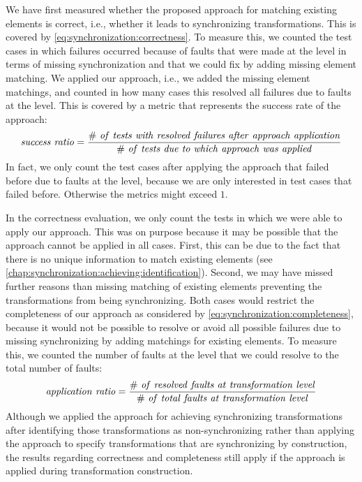 We have first measured whether the proposed approach for matching existing elements is correct, i.e., whether it leads to synchronizing transformations. This is covered by \autoref{eq:synchronization:correctness}.
To measure this, we counted the test cases in which failures occurred because of faults that were made at the \leveltransformation level in terms of missing synchronization and that we could fix by adding missing element matching.
We applied our approach, i.e., we added the missing element matchings, and counted in how many cases this resolved all failures due to faults at the \leveltransformation level.
This is covered by a metric that represents the success rate of the approach:
\begin{align*}
    \mathvariable{success\ ratio} = \frac{\mathvariable{\#\ of\ tests\ with\ resolved\ failures\ after\ approach\ application}}{\mathvariable{\#\ of\ tests\ due\ to\ which\ approach\ was\ applied}}
\end{align*}
In fact, we only count the test cases after applying the approach that failed before due to faults at the \leveltransformation level, because we are only interested in test cases that failed before. Otherwise the metrics might exceed $1$.

In the correctness evaluation, we only count the tests in which we were able to apply our approach.
This was on purpose because it may be possible that the approach cannot be applied in all cases.
First, this can be due to the fact that there is no unique information to match existing elements (see \autoref{chap:synchronization:achieving:identification}).
Second, we may have missed further reasons than missing matching of existing elements preventing the transformations from being synchronizing.
Both cases would restrict the completeness of our approach as considered by \autoref{eq:synchronization:completeness}, because it would not be possible to resolve or avoid all possible failures due to missing synchronizing by adding matchings for existing elements.
To measure this, we counted the number of faults at the \leveltransformation level that we could resolve to the total number of faults:
\begin{align*}
    \mathvariable{application\ ratio} = \frac{\mathvariable{\#\ of\ resolved\ faults\ at\ \leveltransformation\ level}}{\mathvariable{\#\ of\ total\ faults\ at\ \leveltransformation\ level}}
\end{align*}
Although we applied the approach for achieving synchronizing transformations after identifying those transformations as non-synchronizing rather than applying the approach to specify transformations that are synchronizing by construction, the results regarding correctness and completeness still apply if the approach is applied during transformation construction.


